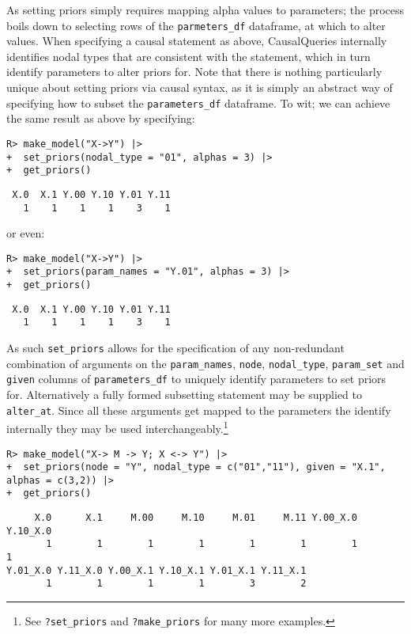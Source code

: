 \documentclass[
  11pt,
  article]{jss}
\begin{document}
As setting priors simply requires mapping alpha values to parameters;
the process boils down to selecting rows of the \texttt{parmeters\_df}
dataframe, at which to alter values. When specifying a causal statement
as above, CausalQueries internally identifies nodal types that are
consistent with the statement, which in turn identify parameters to
alter priors for. Note that there is nothing particularly unique about
setting priors via causal syntax, as it is simply an abstract way of
specifying how to subset the \texttt{parameters\_df} dataframe. To wit;
we can achieve the same result as above by specifying:

\begin{verbatim}
R> make_model("X->Y") |>
+  set_priors(nodal_type = "01", alphas = 3) |>
+  get_priors()
\end{verbatim}

\begin{verbatim}
 X.0  X.1 Y.00 Y.10 Y.01 Y.11 
   1    1    1    1    3    1 
\end{verbatim}

or even:

\begin{verbatim}
R> make_model("X->Y") |>
+  set_priors(param_names = "Y.01", alphas = 3) |>
+  get_priors()
\end{verbatim}

\begin{verbatim}
 X.0  X.1 Y.00 Y.10 Y.01 Y.11 
   1    1    1    1    3    1 
\end{verbatim}

As such \texttt{set\_priors} allows for the specification of any
non-redundant combination of arguments on the \texttt{param\_names},
\texttt{node}, \texttt{nodal\_type}, \texttt{param\_set} and
\texttt{given} columns of \texttt{parameters\_df} to uniquely identify
parameters to set priors for. Alternatively a fully formed subsetting
statement may be supplied to \texttt{alter\_at}. Since all these
arguments get mapped to the parameters the identify internally they may
be used interchangeably.\footnote{See \texttt{?set\_priors} and
  \texttt{?make\_priors} for many more examples.}

\begin{verbatim}
R> make_model("X-> M -> Y; X <-> Y") |>
+  set_priors(node = "Y", nodal_type = c("01","11"), given = "X.1", alphas = c(3,2)) |>
+  get_priors()
\end{verbatim}

\begin{verbatim}
     X.0      X.1     M.00     M.10     M.01     M.11 Y.00_X.0 Y.10_X.0 
       1        1        1        1        1        1        1        1 
Y.01_X.0 Y.11_X.0 Y.00_X.1 Y.10_X.1 Y.01_X.1 Y.11_X.1 
       1        1        1        1        3        2 
\end{verbatim}
\end{document}
